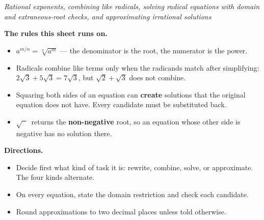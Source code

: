 \documentclass[12pt]{article}
\begin{document}

\begin{center}
\textit{Rational exponents, combining like radicals, solving radical equations
with domain and extraneous-root checks, and approximating irrational solutions}
\end{center}

\noindent\textbf{The rules this sheet runs on.}
\begin{itemize}[leftmargin=1.2cm, itemsep=2pt, topsep=2pt]
\item $a^{m/n} = \sqrt[n]{a^m}$ --- the denominator is the root, the numerator is
the power.
\item Radicals combine like terms only when the radicands match after
simplifying: $2\sqrt{3} + 5\sqrt{3} = 7\sqrt{3}$, but $\sqrt{2} + \sqrt{3}$ does
not combine.
\item Squaring both sides of an equation can \textbf{create} solutions that the
original equation does not have. Every candidate must be substituted back.
\item $\sqrt{\phantom{x}}\,$ returns the \textbf{non-negative} root, so an
equation whose other side is negative has no solution there.
\end{itemize}

\noindent\textbf{Directions.}
\begin{itemize}[leftmargin=1.2cm, itemsep=2pt, topsep=2pt]
\item Decide first what kind of task it is: rewrite, combine, solve, or
approximate. The four kinds alternate.
\item On every equation, state the domain restriction and check each candidate.
\item Round approximations to two decimal places unless told otherwise.
\end{itemize}



\end{document}
